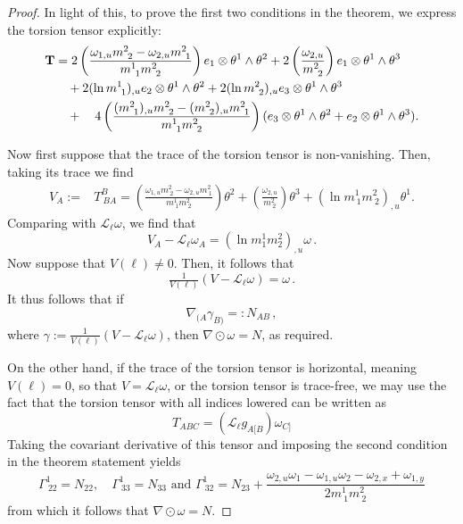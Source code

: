 \documentclass{article}
\newcommand{\ai}{A}
\newcommand{\bb}{B}
\newcommand{\cc}{C}
\theoremstyle{definition}
\theoremstyle{remark}
\begin{document}
\begin{proof}
    In light of this, to prove the first two conditions in the theorem, we express the torsion tensor explicitly: 
        \begin{equation}
    \begin{aligned}
        {\bf T} &= 2 \left( \frac{ \omega_{1,u} m^2_{~2}-\omega_{2,u}m^2_{~1}}{m^1_{~1} m^2_{~2}} \right) e_1 \otimes \theta^1 \wedge \theta^2 + 2\left( \frac{\omega_{2,u}}{m^2_{~2}} \right) e_1 \otimes \theta^1 \wedge \theta^3 \\ 
        &\quad + 2(\ln m^1_{~1})_{,u} e_2 \otimes \theta^1 \wedge \theta^2 + 2(\ln m^2_{~2})_{,u} e_3\otimes \theta^1  \wedge \theta^3  \\
        &\quad  + \quad 4 \left(\frac{(m^2_{~1})_{,u} m^2_{~2} - (m^2_{~2})_{,u} m^2_{~1}}{m^1_{~1} m^2_{~2}} \right) (e_3 \otimes \theta^1 \wedge \theta^2 + e_2 \otimes \theta^1 \wedge \theta^3).
    \end{aligned}
    \end{equation}

\medskip

    Now first suppose that the trace of the torsion tensor is non-vanishing. Then, taking its trace we find
    \begin{equation}
    \begin{aligned}
            V_\ai :=&  T^\bb_{~\bb \ai} = \left( \frac{ \omega_{1,u} m^2_{~2}-\omega_{2,u}m^2_{~1}}{m^1_{~1} m^2_{~2}} \right) \theta^2 + \left( \frac{\omega_{2,u}}{m^2_{~2}} \right) \theta^3 + (\ln m^1_{~1} m^2_{~2} )_{,u} \theta^1.
    \end{aligned}
    \end{equation}
    Comparing with $\mathcal{L}_{\ell} \omega$, we find that
    $$V_\ai - \mathcal{L}_{\ell} \omega_\ai = (\ln m^1_1 m^2_2)_{,u} \omega\,.$$
    Now suppose that $V(\ell) \neq 0$. Then, it follows that 
    \begin{equation}
        \tfrac{1}{V(\ell)} (V - \mathcal{L}_\ell \omega) = \omega\,.
    \end{equation}
    \noindent It thus follows that if
    $$\nabla_{(\ai} \gamma_{\bb)} =: N_{\ai \bb}\,,$$
    where
    $\gamma := \tfrac{1}{V(\ell)} (V - \mathcal{L}_\ell \omega)$, then $\nabla \odot \omega = N$, as required.

    On the other hand,
    if the trace of the torsion tensor is horizontal, meaning $V(\ell) = 0$, so that $V = \mathcal{L}_\ell \omega$, or the torsion tensor is trace-free, we may use the fact that the torsion tensor with all indices lowered can be written as 
    \begin{equation}
        T_{\ai \bb \cc} = (\mathcal{L}_\ell g_{\ai[\bb}) \omega_{\cc]}
    \end{equation}
    \noindent Taking the covariant derivative of this tensor and imposing the second condition in the theorem statement  yields $$\Gamma^1_{~22} = N_{22}, \quad \Gamma^1_{~33} = N_{33} \text{ and } \Gamma^1_{~32} = N_{23} +  \frac{\omega_{2,u} \omega_1- \omega_{1,u} \omega_2 - \omega_{2,x}+\omega_{1,y}}{2 m^1_{~1} m^2_{~2}}$$ from which it follows that $ \nabla \odot\omega = N$.


\end{proof}
\end{document}
